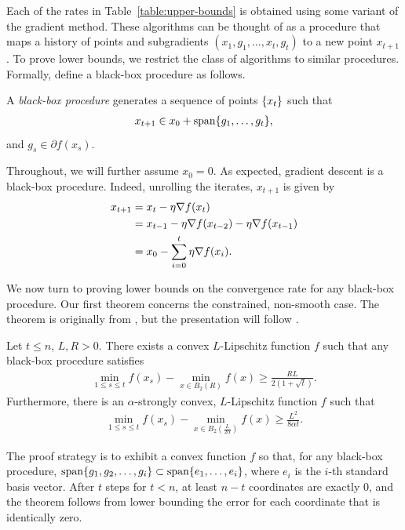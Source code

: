 Each of the rates in Table~\eqref{table:upper-bounds} is obtained using some variant of the
gradient method. These algorithms can be thought of as a procedure that
maps a history of points and subgradients $(x_1, g_1, \dots, x_t, g_t)$ to a 
new point $x_{t+1}$. To prove lower bounds, we restrict the class of algorithms 
to similar procedures. Formally, define a black-box procedure as follows.

\begin{definition}
A \textit{black-box procedure} generates a sequence of points $\{x_t\}$
such that
\begin{align*}
    x_{t+1} \in x_0 + \mathop{\rm span}\{g_1, \dots, g_t\},
\end{align*}
and $g_s \in \partial f (x_s)$.
\end{definition}
Throughout, we will further assume $x_0 = 0$. As expected, gradient descent is a
black-box procedure. Indeed, unrolling the iterates, $x_{t+1}$ is given by
\begin{align*}
    x_{t+1} 
    &= x_t - \eta \nabla f(x_t) \\
    &= x_{t-1} - \eta \nabla f(x_{t-2}) - \eta \nabla f(x_{t-1}) \\
    &= x_0 - \sum_{i=0}^t \eta \nabla f (x_i).
\end{align*}

We now turn to proving lower bounds on the convergence rate for any 
black-box procedure.
Our first theorem concerns the constrained, non-smooth case.
The theorem is originally from \cite{nesterov83}, but the presentation will
follow \cite{nesterov04}.
~
\begin{theorem}\label{theorem:lb-non-smooth}
Let $t \leq n$, $L, R  > 0$. There exists a convex $L$-Lipschitz function $f$
such that any black-box procedure satisfies
\begin{align}
    \min_{1 \leq s \leq t} f(x_s) - \min_{x \in B_2(R)} f(x)
    \geq \frac{RL}{2(1+\sqrt{t})}.
\end{align}
Furthermore, there is an $\alpha$-strongly convex, $L$-Lipschitz function $f$
such that
\begin{align}
    \min_{1 \leq s \leq t} f(x_s) - \min_{x \in B_2(\frac{L}{2\alpha})} f(x)
    \geq \frac{L^2}{8\alpha t}.
\end{align}
\end{theorem}
The proof strategy is to exhibit a convex function $f$ so that, for any black-box procedure,
$\mathop{\rm span}\{g_1, g_2, \dots, g_i\} \subset \mathop{\rm span}\{e_1, \dots, e_i\}$, where
$e_i$ is the $i$-th standard basis vector. After $t$ steps for $t < n$, at least
$n-t$ coordinates are exactly 0, and the theorem follows from lower bounding the
error for each coordinate that is identically zero. 

